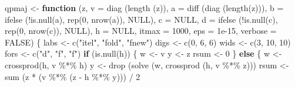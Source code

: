 \documentclass[
  12pt,
]{book}
\newenvironment{Shaded}{\begin{snugshade}}{\end{snugshade}}
\newcommand{\AttributeTok}[1]{\textcolor[rgb]{0.77,0.63,0.00}{#1}}
\newcommand{\ConstantTok}[1]{\textcolor[rgb]{0.00,0.00,0.00}{#1}}
\newcommand{\ControlFlowTok}[1]{\textcolor[rgb]{0.13,0.29,0.53}{\textbf{#1}}}
\newcommand{\DecValTok}[1]{\textcolor[rgb]{0.00,0.00,0.81}{#1}}
\newcommand{\FloatTok}[1]{\textcolor[rgb]{0.00,0.00,0.81}{#1}}
\newcommand{\FunctionTok}[1]{\textcolor[rgb]{0.00,0.00,0.00}{#1}}
\newcommand{\NormalTok}[1]{#1}
\newcommand{\OtherTok}[1]{\textcolor[rgb]{0.56,0.35,0.01}{#1}}
\newcommand{\SpecialCharTok}[1]{\textcolor[rgb]{0.00,0.00,0.00}{#1}}
\newcommand{\StringTok}[1]{\textcolor[rgb]{0.31,0.60,0.02}{#1}}
\theoremstyle{definition}
\theoremstyle{definition}
\theoremstyle{definition}
\theoremstyle{definition}
\theoremstyle{remark}
\begin{document}
\begin{Shaded}
\begin{Highlighting}[]
\NormalTok{qpmaj }\OtherTok{\textless{}{-}}
  \ControlFlowTok{function}\NormalTok{ (z,}
            \AttributeTok{v =} \FunctionTok{diag}\NormalTok{ (}\FunctionTok{length}\NormalTok{ (z)),}
            \AttributeTok{a =} \FunctionTok{diff}\NormalTok{ (}\FunctionTok{diag}\NormalTok{ (}\FunctionTok{length}\NormalTok{(z))),}
            \AttributeTok{b =} \FunctionTok{ifelse}\NormalTok{ (}\SpecialCharTok{!}\FunctionTok{is.null}\NormalTok{(a), }\FunctionTok{rep}\NormalTok{(}\DecValTok{0}\NormalTok{, }\FunctionTok{nrow}\NormalTok{(a)), }\ConstantTok{NULL}\NormalTok{),}
            \AttributeTok{c =} \ConstantTok{NULL}\NormalTok{,}
            \AttributeTok{d =} \FunctionTok{ifelse}\NormalTok{ (}\SpecialCharTok{!}\FunctionTok{is.null}\NormalTok{(c), }\FunctionTok{rep}\NormalTok{(}\DecValTok{0}\NormalTok{, }\FunctionTok{nrow}\NormalTok{(c)), }\ConstantTok{NULL}\NormalTok{),}
            \AttributeTok{h =} \ConstantTok{NULL}\NormalTok{,}
            \AttributeTok{itmax =} \DecValTok{1000}\NormalTok{,}
            \AttributeTok{eps =} \FloatTok{1e{-}15}\NormalTok{,}
            \AttributeTok{verbose =} \ConstantTok{FALSE}\NormalTok{) \{}
\NormalTok{    labs }\OtherTok{\textless{}{-}} \FunctionTok{c}\NormalTok{(}\StringTok{"itel"}\NormalTok{, }\StringTok{"fold"}\NormalTok{, }\StringTok{"fnew"}\NormalTok{)}
\NormalTok{    digs }\OtherTok{\textless{}{-}} \FunctionTok{c}\NormalTok{(}\DecValTok{0}\NormalTok{, }\DecValTok{6}\NormalTok{, }\DecValTok{6}\NormalTok{)}
\NormalTok{    wids }\OtherTok{\textless{}{-}} \FunctionTok{c}\NormalTok{(}\DecValTok{3}\NormalTok{, }\DecValTok{10}\NormalTok{, }\DecValTok{10}\NormalTok{)}
\NormalTok{    fors }\OtherTok{\textless{}{-}} \FunctionTok{c}\NormalTok{(}\StringTok{"d"}\NormalTok{, }\StringTok{"f"}\NormalTok{, }\StringTok{"f"}\NormalTok{)}
    \ControlFlowTok{if}\NormalTok{ (}\FunctionTok{is.null}\NormalTok{(h)) \{}
\NormalTok{      w }\OtherTok{\textless{}{-}}\NormalTok{ v}
\NormalTok{      y }\OtherTok{\textless{}{-}}\NormalTok{ z}
\NormalTok{      rsum }\OtherTok{\textless{}{-}} \DecValTok{0}
\NormalTok{    \} }\ControlFlowTok{else}\NormalTok{ \{}
\NormalTok{      w }\OtherTok{\textless{}{-}} \FunctionTok{crossprod}\NormalTok{(h, v }\SpecialCharTok{\%*\%}\NormalTok{ h)}
\NormalTok{      y }\OtherTok{\textless{}{-}} \FunctionTok{drop}\NormalTok{ (}\FunctionTok{solve}\NormalTok{ (w, }\FunctionTok{crossprod}\NormalTok{ (h, v }\SpecialCharTok{\%*\%}\NormalTok{ z)))}
\NormalTok{      rsum }\OtherTok{\textless{}{-}} \FunctionTok{sum}\NormalTok{ (z }\SpecialCharTok{*}\NormalTok{ (v }\SpecialCharTok{\%*\%}\NormalTok{ (z }\SpecialCharTok{{-}}\NormalTok{ h }\SpecialCharTok{\%*\%}\NormalTok{ y))) }\SpecialCharTok{/} \DecValTok{2}

\end{Highlighting}
\end{Shaded}
\end{document}
